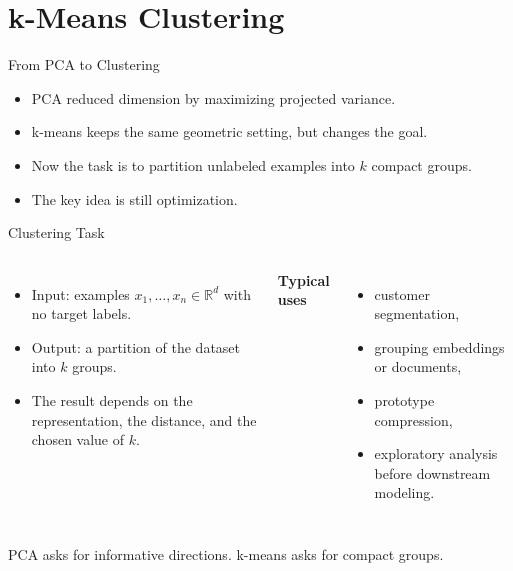 \section{k-Means Clustering}

\begin{frame}{From PCA to Clustering}
\begin{itemize}
  \item PCA reduced dimension by maximizing projected variance.
  \pause
  \item k-means keeps the same geometric setting, but changes the goal.
  \pause
  \item Now the task is to partition unlabeled examples into $k$ compact groups.
  \pause
  \item The key idea is still optimization.
\end{itemize}
\end{frame}

\begin{frame}{Clustering Task}
\begin{columns}[T]
\begin{itemize}
  \item Input: examples $x_1,\dots,x_n \in \mathbb{R}^d$ with no target labels.
  \pause
  \item Output: a partition of the dataset into $k$ groups.
  \pause
  \item The result depends on the representation, the distance, and the chosen value of $k$.
\end{itemize}

\pause
{}
\textbf{Typical uses}
\begin{itemize}
  \item customer segmentation,
  \pause
  \item grouping embeddings or documents,
  \pause
  \item prototype compression,
  \pause
  \item exploratory analysis before downstream modeling.
\end{itemize}
\end{columns}

\pause
\begin{rlintuition}
PCA asks for informative directions. k-means asks for compact groups.
\end{rlintuition}
\end{frame}

